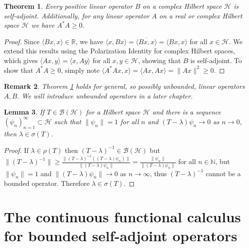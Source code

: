 \documentclass[12pt,oneside]{report}
\newtheorem{thm}{Theorem}[chapter]
\newtheorem{lem}[thm]{Lemma}
\newtheorem{rem}[thm]{Remark}
\begin{document}
\begin{thm}\label{pos-selfadj}
    Every positive linear operator $B$ on a complex Hilbert space $\mathscr{H}$ is self-adjoint. Additionally, for any linear operator $A$ on a real or complex Hilbert space $\mathscr{H}$ we have $A^{*}A \geq 0$.
\end{thm}
\begin{proof}
    Since $\langle Bx, x \rangle \in \mathbb{R}$, we have $\langle x, Bx \rangle = \overline{\langle Bx, x \rangle} = \langle Bx, x \rangle$ for all $x \in \mathscr{H}$. We extend this results using the Polarization Identity for complex Hilbert spaces, which gives $\langle Ax, y \rangle = \langle x, Ay \rangle$ for all $x,y \in \mathscr{H}$, showing that $B$ is self-adjoint. To show that $A^{*}A \geq 0$, simply note $\langle A^{*}Ax,x \rangle = \langle Ax, Ax \rangle = \|Ax\|^{2} \geq 0$.
\end{proof}

\begin{rem}
    Theorem \ref{pos-selfadj} holds for general, so possibly unbounded, linear operators $A,B$. We will introduce unbounded operators in a later chapter.
\end{rem}

\begin{lem}\label{spectr-condition}
    If $T \in \mathscr{B}(\mathscr{H})$ for a Hilbert space $\mathscr{H}$ and there is a sequence $(\psi_{n})_{n=1}^{\infty} \subset \mathscr{H}$ such that $\|\psi_{n}\| = 1$ for all $n$ and $(T-\lambda)\psi_{n} \to 0$ as $n \to 0$, then $\lambda \in \sigma(T)$.
\end{lem}
\begin{proof}
    If $\lambda \in \rho(T)$ then $(T - \lambda)^{-1} \in \mathscr{B}(\mathscr{H})$ but $\|(T - \lambda)^{-1}\| \geq \frac{\|(T - \lambda)^{-1}((T - \lambda)\psi_{n})\|}{\|(T-\lambda)\psi_{n}\|} = \frac{\|\psi_{n}\|}{\|(T-\lambda)\psi_{n}\|}$ for all $n \in \mathbb{N}$, but $\|\psi_{n}\| = 1$ and $\|(T-\lambda)\psi_{n}\| \to 0$ as $n \to \infty$, thus $(T-\lambda)^{-1}$ cannot be a bounded operator. Therefore $\lambda \in \sigma(T)$.
\end{proof}

\chapter{The continuous functional calculus for bounded self-adjoint operators}

\end{document}
